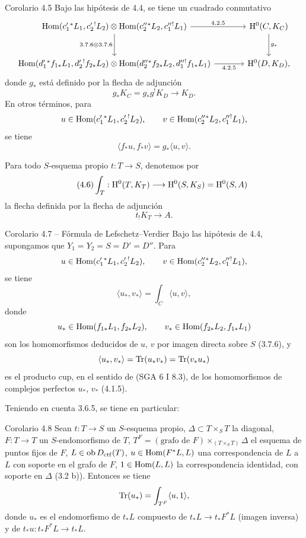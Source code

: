 \begin{statement}{Corolario 4.5}
Bajo las hipótesis de 4.4, se tiene un cuadrado conmutativo
\[
\begin{tikzcd}[column sep=large,row sep=large]
\Hom(c_1'{}^*L_1,c_2'{}^!L_2)\otimes
\Hom(c_2''{}^*L_2,c_1''{}^!L_1)
 \arrow[r,"4.2.5"] \arrow[d,"3.7.6\otimes 3.7.6"'] &
\H^0(C,K_C)\arrow[d,"g_*"]\\
\Hom(d_1'{}^*f_{1*}L_1,d_2'{}^!f_{2*}L_2)\otimes
\Hom(d_2''{}^*f_{2*}L_2,d_1''{}^!f_{1*}L_1)
 \arrow[r,"4.2.5"'] &
\H^0(D,K_D),
\end{tikzcd}
\]
donde $g_*$ está definido por la flecha de adjunción
\[
g_*K_C=g_*g^!K_D\longrightarrow K_D.
\]
En otros términos, para
\[
u\in\operatorname{Hom}(c_1'{}^*L_1,c_2'{}^!L_2),\qquad
v\in\operatorname{Hom}(c_2''{}^*L_2,c_1''{}^!L_1),
\]
se tiene
\begin{equation}
\tag{4.5.1}
\langle f_*u,f_*v\rangle=g_*\langle u,v\rangle.
\end{equation}
\end{statement}

Para todo $S$-esquema propio $t:T\longrightarrow S$, denotemos por
\begin{equation}
\tag{4.6}
\int_T:\mathrm{H}^0(T,K_T)\longrightarrow \mathrm{H}^0(S,K_S)=\mathrm{H}^0(S,A)
\end{equation}
la flecha definida por la flecha de adjunción
\[
t_!K_T\longrightarrow A.
\]

\begin{statement}{Corolario 4.7 -- Fórmula de Lefschetz--Verdier}
Bajo las hipótesis de 4.4, supongamos que $Y_1=Y_2=S=D'=D''$. Para
\[
u\in\operatorname{Hom}(c_1'{}^*L_1,c_2'{}^!L_2),\qquad
v\in\operatorname{Hom}(c_2''{}^*L_2,c_1''{}^!L_1),
\]
se tiene
\begin{equation}
\tag{4.7.1}
\langle u_*,v_*\rangle=\int_C\langle u,v\rangle,
\end{equation}
donde
\[
u_*\in\operatorname{Hom}(f_{1*}L_1,f_{2*}L_2),\qquad
v_*\in\operatorname{Hom}(f_{2*}L_2,f_{1*}L_1)
\]
son los homomorfismos deducidos de $u$, $v$ por imagen directa sobre $S$ (3.7.6), y
\[
\langle u_*,v_*\rangle=\operatorname{Tr}(u_*v_*)=\operatorname{Tr}(v_*u_*)
\]
es el producto cup, en el sentido de (SGA 6 I 8.3), de los homomorfismos de complejos perfectos $u_*$, $v_*$ (4.1.5).
\end{statement}

Teniendo en cuenta 3.6.5, se tiene en particular:

\begin{statement}{Corolario 4.8}
Sean $t:T\longrightarrow S$ un $S$-esquema propio, $\Delta\subset T\times_S T$ la diagonal, $F:T\longrightarrow T$ un $S$-endomorfismo de $T$, $T^F=(\text{grafo de }F)\times_{(T\times_S T)}\Delta$ el esquema de puntos fijos de $F$, $L\in\operatorname{ob}D_{\mathrm{ctf}}(T)$, $u\in\operatorname{Hom}(F^*L,L)$ una correspondencia de $L$ a $L$ con soporte en el grafo de $F$, $1\in\operatorname{Hom}(L,L)$ la correspondencia identidad, con soporte en $\Delta$ (3.2 b)). Entonces se tiene
\[
\operatorname{Tr}(u_*)=\int_{T^F}\langle u,1\rangle,
\]
donde $u_*$ es el endomorfismo de $t_*L$ compuesto de $t_*L\longrightarrow t_*F^*L$ (imagen inversa) y de $t_*u:t_*F^*L\longrightarrow t_*L$.
\end{statement}

